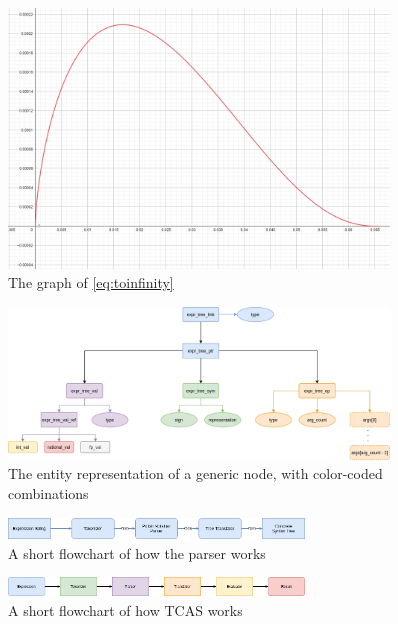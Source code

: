 \documentclass{article}
\theoremstyle{plain}
\theoremstyle{definition}
\theoremstyle{algorithm}
\begin{document}
	
	\newpage
	\nocite{book:kr}
	\nocite{pdf:gnump}
	\nocite{pdf:mpfr}
	\printbibliography
	\clearpage
	\begin{appendices}
		\begin{figure}
			\centering
			\includegraphics[width=0.9\textwidth]{img/limoff1.PNG}
			\caption{The graph of \eqref{eq:toinfinity}}\label{fig:limoff1}
		\end{figure}
		
		\begin{figure}
			\centering
			\includegraphics[width=0.9\textwidth]{chart/expr_structs.PNG}
			\caption{The entity representation of a generic node, with color-coded combinations} \label{fig:expr_structs}
		\end{figure}
		
		\begin{figure}
			\centering
			\includegraphics[width=0.7\textwidth]{chart/parser.PNG}
			\caption{A short flowchart of how the parser works} \label{fig:parser}
		\end{figure}
		
		\begin{figure}
			\centering
			\includegraphics[width=0.7\textwidth]{chart/general_flowchart.PNG}
			\caption{A short flowchart of how TCAS works} \label{fig:tcas} 
		\end{figure}
		

\end{appendices}
\end{document}
